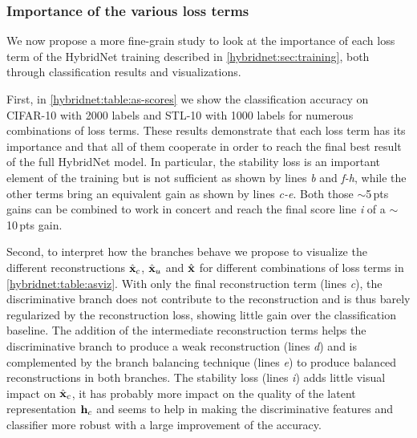 \begin{table}[p]
  \label{hybridnet:table:abl}
\end{table}



\subsubsection{Importance of the various loss terms}

We now propose a more fine-grain study to look at the importance of each loss term of the HybridNet training described in \autoref{hybridnet:sec:training}, both through classification results and visualizations.

First, in \autoref{hybridnet:table:as-scores} we show the classification accuracy on CIFAR-10 with 2000 labels and STL-10 with 1000 labels for numerous combinations of loss terms. These results demonstrate that each loss term has its importance and that all of them cooperate in order to reach the final best result of the full HybridNet model. In particular, the stability loss is an important element of the training but is not sufficient as shown by lines \textit{b} and \textit{f-h}, while the other terms bring an equivalent gain as shown by lines \textit{c-e}. Both those $\sim$5\,pts gains can be combined to work in concert and reach the final score line \textit{i} of a $\sim$10\,pts gain.

Second, to interpret how the branches behave we propose to visualize the different reconstructions $\hat{\mathbf{x}}_c$, $\hat{\mathbf{x}}_u$ and $\hat{\mathbf{x}}$ for different combinations of loss terms in \autoref{hybridnet:table:asviz}. With only the final reconstruction term (lines \textit{c}), the discriminative branch does not contribute to the reconstruction and is thus barely regularized by the reconstruction loss, showing little gain over the classification baseline. The addition of the intermediate reconstruction terms helps the discriminative branch to produce a weak reconstruction (lines \textit{d}) and is complemented by the branch balancing technique (lines \textit{e}) to produce balanced reconstructions in both branches. The stability loss (lines \textit{i}) adds little visual impact on $\hat{\mathbf{x}}_c$, it has probably more impact on the quality of the latent representation $\mathbf{h}_c$ and seems to help in making the discriminative features and classifier more robust with a large improvement of the accuracy.


